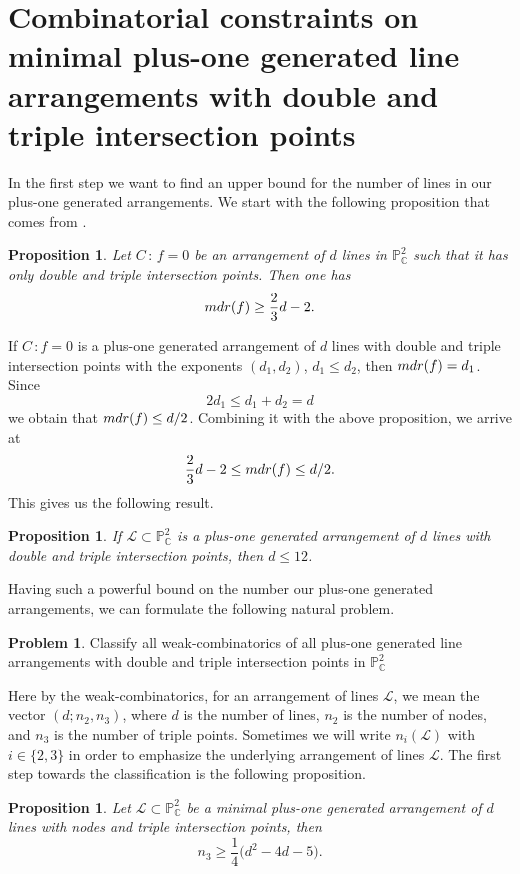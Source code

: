 \documentclass[12pt]{article}
\theoremstyle{plain}
\newtheorem{proposition}[thm]{Proposition}
\theoremstyle{definition}
\newtheorem{problem}[thm]{Problem}
\begin{document}
\section{Combinatorial constraints on minimal plus-one generated line arrangements with double and triple intersection points}
In the first step we want to find an upper bound for the number of lines in our plus-one generated arrangements. We start with the following proposition that comes from \cite[Proposition 4.7]{DimcaPokora}.
\begin{proposition}
Let $C \, : \, f = 0$ be an arrangement of $d$ lines in $\mathbb{P}^{2}_{\mathbb{C}}$ such that it has only double and triple intersection points. Then one has
$${\rm mdr}(f) \geq \frac{2}{3}d - 2.$$
\end{proposition}
If $C \, : f=0$ is a plus-one generated arrangement of $d$ lines with double and triple intersection points with the exponents $(d_{1}, d_{2})$, $d_{1}\leq d_{2}$, then ${\rm mdr}(f) = d_{1}$. Since 
$$2d_{1} \leq d_{1}+d_{2} =d$$
we obtain that ${\rm mdr}(f) \leq d/2$. Combining it with the above proposition, we arrive at
$$\frac{2}{3}d - 2 \leq {\rm mdr}(f) \leq d/2.$$
This gives us the following result.
\begin{proposition}
If $\mathcal{L} \subset \mathbb{P}^{2}_{\mathbb{C}}$ is a plus-one generated arrangement of $d$ lines with double and triple intersection points, then $d\leq 12$. 
\end{proposition}
Having such a powerful bound on the number our plus-one generated arrangements, we can formulate the following natural problem.
\begin{problem}
Classify all weak-combinatorics of all plus-one generated line arrangements with double and triple intersection points in $\mathbb{P}^{2}_{\mathbb{C}}$
\end{problem}
Here by the weak-combinatorics, for an arrangement of lines $\mathcal{L}$, we mean the vector $(d;n_{2},n_{3})$, where $d$ is the number of lines, $n_{2}$ is the number of nodes, and $n_{3}$ is the number of triple points. Sometimes we will write $n_{i}(\mathcal{L})$ with $i \in \{2,3\}$ in order to emphasize the underlying arrangement of lines $\mathcal{L}$.
The first step towards the classification is the following proposition.
\begin{proposition}
\label{triple}
Let $\mathcal{L} \subset \mathbb{P}^{2}_{\mathbb{C}}$ be a minimal plus-one generated arrangement of $d$ lines with nodes and triple intersection points, then
\begin{equation}
\label{t3}
n_{3} \geq \frac{1}{4}\bigg(d^{2}-4d-5\bigg).
\end{equation}
\end{proposition}
\end{document}
